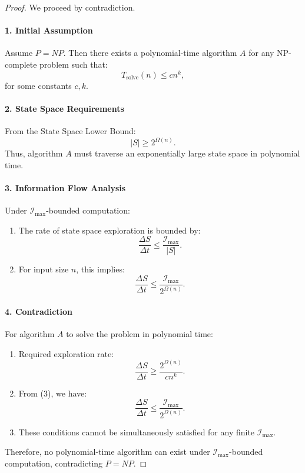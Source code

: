 \documentclass[12pt]{article}
\begin{document}
\begin{proof}
We proceed by contradiction.

\paragraph{1. Initial Assumption}
Assume \(P = NP\). Then there exists a polynomial-time algorithm \(A\) for any NP-complete problem such that:
\[
T_{\text{solve}}(n) \leq cn^k,
\]
for some constants \(c, k\).

\paragraph{2. State Space Requirements}
From the State Space Lower Bound:
\[
|S| \geq 2^{\Omega(n)}.
\]
Thus, algorithm \(A\) must traverse an exponentially large state space in polynomial time.

\paragraph{3. Information Flow Analysis}
Under \(\mathcal{I}_{\text{max}}\)-bounded computation:
\begin{enumerate}
    \item The rate of state space exploration is bounded by:
    \[
    \frac{\Delta S}{\Delta t} \leq \frac{\mathcal{I}_{\text{max}}}{|S|}.
    \]
    
    \item For input size \(n\), this implies:
    \[
    \frac{\Delta S}{\Delta t} \leq \frac{\mathcal{I}_{\text{max}}}{2^{\Omega(n)}}.
    \]
\end{enumerate}

\paragraph{4. Contradiction}
For algorithm \(A\) to solve the problem in polynomial time:
\begin{enumerate}
    \item Required exploration rate:
    \[
    \frac{\Delta S}{\Delta t} \geq \frac{2^{\Omega(n)}}{cn^k}.
    \]
    
    \item From (3), we have:
    \[
    \frac{\Delta S}{\Delta t} \leq \frac{\mathcal{I}_{\text{max}}}{2^{\Omega(n)}}.
    \]
    
    \item These conditions cannot be simultaneously satisfied for any finite \(\mathcal{I}_{\text{max}}\).
\end{enumerate}

Therefore, no polynomial-time algorithm can exist under \(\mathcal{I}_{\text{max}}\)-bounded computation, contradicting \(P = NP\).
\end{proof}
\end{document}
